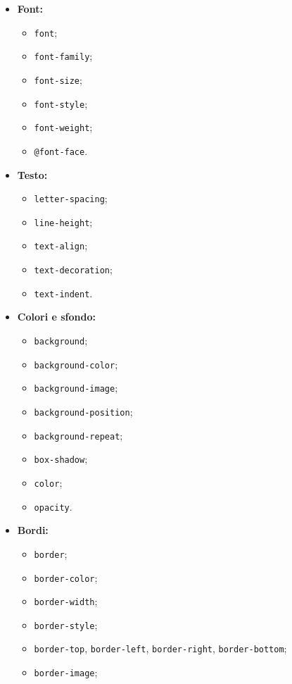 \documentclass[a4paper,11pt]{article}
\begin{document}
\begin{itemize}
	\item \textbf{Font:}
		\begin{itemize}
			\item \lstinline|font|;
			\item \lstinline|font-family|;
			\item \lstinline|font-size|;
			\item \lstinline|font-style|;
			\item \lstinline|font-weight|;
			\item \lstinline|@font-face|.
		\end{itemize}
	\item \textbf{Testo:}
		\begin{itemize}
			\item \lstinline|letter-spacing|;
			\item \lstinline|line-height|;
			\item \lstinline|text-align|;
			\item \lstinline|text-decoration|;
			\item \lstinline|text-indent|.
		\end{itemize}
	\item \textbf{Colori e sfondo:}
		\begin{itemize}
			\item \lstinline|background|;
			\item \lstinline|background-color|;
			\item \lstinline|background-image|;
			\item \lstinline|background-position|;
			\item \lstinline|background-repeat|;
			\item \lstinline|box-shadow|;
			\item \lstinline|color|;
			\item \lstinline|opacity|.
		\end{itemize}
	\item \textbf{Bordi:}
		\begin{itemize}
			\item \lstinline|border|;
			\item \lstinline|border-color|;
			\item \lstinline|border-width|;
			\item \lstinline|border-style|;
			\item \lstinline|border-top|, \lstinline|border-left|, \lstinline|border-right|, \lstinline|border-bottom|;
			\item \lstinline|border-image|;

\end{itemize}
\end{itemize}
\end{document}
